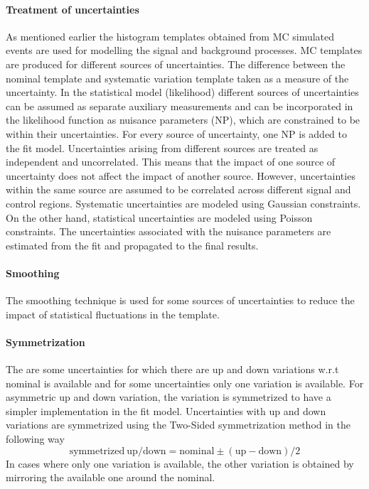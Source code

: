 \paragraph{Treatment of uncertainties} As mentioned earlier the histogram templates obtained from MC simulated events are used for modelling the signal and background processes. MC templates are produced for different sources of uncertainties. The difference between the nominal template and systematic variation template taken as a measure of the uncertainty. %
In the statistical model (likelihood) different sources of uncertainties can be assumed as separate auxiliary measurements and can be incorporated in the likelihood function as nuisance parameters (NP), which are constrained to be within their uncertainties. For every source of uncertainty, one NP is added to the fit model. Uncertainties arising from different sources are treated as independent and uncorrelated. This means that the impact of one source of uncertainty does not affect the impact of another source. However, uncertainties within the same source are assumed to be correlated across different signal and control regions. Systematic uncertainties are modeled using Gaussian constraints. On the other hand, statistical uncertainties are modeled using Poisson constraints. The uncertainties associated with the nuisance parameters are estimated from the fit and propagated to the final results.

\paragraph{Smoothing}The smoothing technique is used for some sources of uncertainties to reduce the impact of statistical fluctuations in the template.

\paragraph{Symmetrization}The are some uncertainties for which there are up and down variations w.r.t nominal is available and for some uncertainties only one variation is available. For asymmetric up and down variation, the variation is symmetrized to have a simpler implementation in the fit model. Uncertainties with up and down variations are symmetrized using the Two-Sided symmetrization method in the following way $$ \mathrm{symmetrized \ up/down} = \mathrm{nominal} \pm (\mathrm{up - down})/2 $$ In cases where only one variation is available, the other variation is obtained by mirroring the available one around the nominal. 

